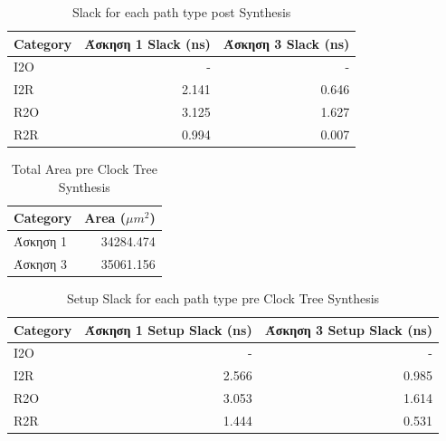 \begin{table}[H]
    \centering
    \caption{Slack for each path type post Synthesis}
    \begin{tabular}{lrr}
        \toprule
        Category & Άσκηση 1 Slack (ns) & Άσκηση 3 Slack (ns) \\
        \midrule
        I2O & - & - \\
        I2R & 2.141 & 0.646 \\
        R2O & 3.125 & 1.627 \\
        R2R & 0.994 & 0.007 \\
        \bottomrule
    \end{tabular}
\end{table}

\begin{table}[H]
    \centering
    \caption{Total Area pre Clock Tree Synthesis}
    \begin{tabular}{lr}
        \toprule
        Category & Area ($\mu m^2$) \\
        \midrule
        Άσκηση 1 & 34284.474 \\
        Άσκηση 3 & 35061.156 \\
        \bottomrule
    \end{tabular}
\end{table}

\begin{table}[H]
    \centering
    \caption{Setup Slack for each path type pre Clock Tree Synthesis}
    \begin{tabular}{lrr}
        \toprule
        Category & Άσκηση 1 Setup Slack (ns) & Άσκηση 3 Setup Slack (ns) \\
        \midrule
        I2O & - & - \\
        I2R & 2.566 & 0.985 \\
        R2O & 3.053 & 1.614 \\
        R2R & 1.444 & 0.531 \\
        \bottomrule
    \end{tabular}
\end{table}

